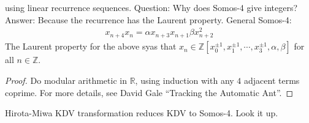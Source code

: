 \documentclass[12pt,reqno]{amsart}
\numberwithin{equation}{section}  %
\newcommand{\rr}{\mathbb{R}}
\newcommand{\zz}{\mathbb{Z}}
\begin{document}
  using linear recurrence sequences.
  Question: Why does Somos-4 give integers? Answer: Because the recurrence has the
  Laurent property. General Somos-4:
%
%
  \begin{equation*}
    \begin{split}
      x_{n+4}x_{n} = \alpha x_{n+3} x_{n+1} \beta x_{n+2}^{2}
    \end{split}
  \end{equation*}
%
%
  The Laurent property for the above syas that $x_{n} \in \zz[x_{0}^{\pm 1},
  x_{1}^{\pm 1}, \cdots, x_{3}^{\pm 1}, \alpha, \beta ]$ for all $n \in \zz$. 
%
%
  \begin{proof}
    Do modular arithmetic in $\rr$, using induction with any $4$ adjacent terms
    coprime. For more details, see David Gale ``Tracking the Automatic Ant''.
  \end{proof}
%
%
  Hirota-Miwa KDV transformation reduces KDV to Somos-4. Look it up.
%
%
%
%
%
%
%
%
\end{document}
